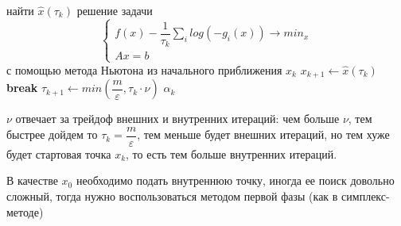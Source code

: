 \begin{algorithm}[H]
	\begin{algorithmic}[1]
		\State найти $\hat{x}(\tau_k)$ решение задачи
		$$ \begin{cases} f(x) - \dfrac{1}{\tau_k}\sum_i log(-g_i(x)) \to min_x \\ Ax=b \end{cases}$$
		с помощью метода Ньютона из начального приближения $x_k$
		\State $x_{k+1} \gets \hat{x}(\tau_k)$
		 \textbf{break}
		\EndIf
		\State $\tau_{k+1} \gets min\left(\dfrac{m}{\varepsilon}, \tau_k \cdot \nu \right)$
		\EndFor
		\State \Return $\alpha_k$
		\EndProcedure
	\end{algorithmic}
\end{algorithm}

$\nu$ отвечает за трейдоф внешних и внутренних итераций: чем больше $\nu$, тем быстрее дойдем то $\tau_k = \dfrac{m}{\varepsilon}$, тем меньше будет внешних итераций, но тем хуже будет стартовая точка $x_k$, то есть тем больше внутренних итераций.

В качестве $x_0$ необходимо подать внутреннюю точку, иногда ее поиск довольно сложный, тогда нужно воспользоваться методом первой фазы (как в симплекс-методе)
